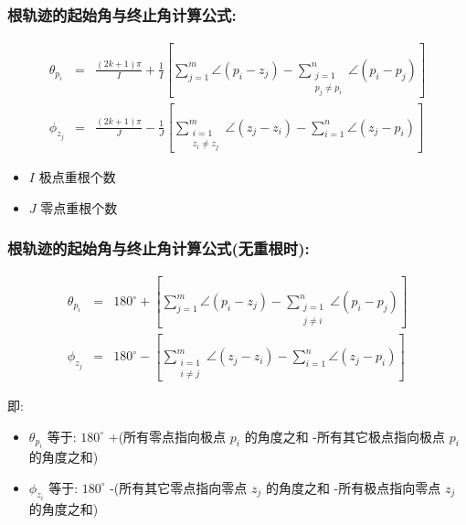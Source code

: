 \documentclass{beamer}
\begin{document}
\begin{frame}
\frametitle{根轨迹的起始角与终止角计算公式:}
\label{sec-1-10}

   
\begin{eqnarray*}
\theta_{p_i} & = & \frac{(2k+1)\pi}{I}+\frac{1}{I}\left[\sum_{j=1}^m\angle(p_i-z_j)-\sum_{\substack{j=1 \\ p_j\neq p_i}}^n\angle(p_i-p_j)\right] \\
\phi_{z_j} & = & \frac{(2k+1)\pi}{J}-\frac{1}{J}\left[\sum_{\substack{i=1 \\ z_i\neq z_j}}^m\angle(z_j-z_i)-\sum_{i=1}^n\angle(z_j-p_i)\right] 
\end{eqnarray*}
\begin{itemize}
\item $I$ 极点重根个数
\item $J$ 零点重根个数
\end{itemize}
\end{frame}
\begin{frame}
\frametitle{根轨迹的起始角与终止角计算公式(无重根时):}
\label{sec-1-11}

   
\begin{eqnarray*}
\theta_{p_i} & = & 180^{\circ}+\left[\sum_{j=1}^m\angle(p_i-z_j)-\sum_{\substack{j=1 \\ j\neq i}}^n\angle(p_i-p_j)\right] \\
\phi_{z_j} & = & 180^{\circ}-\left[\sum_{\substack{i=1 \\ i\neq j}}^m\angle(z_j-z_i)-\sum_{i=1}^n\angle(z_j-p_i)\right] 
\end{eqnarray*}

即:
\begin{itemize}
\item $\theta_{p_i}$  等于:  $180^{\circ}$  +(所有零点指向极点 $p_i$ 的角度之和 -所有其它极点指向极点 $p_i$ 的角度之和)
\item $\phi_{z_i}$ 等于: $180^{\circ}$ -(所有其它零点指向零点 $z_j$ 的角度之和 -所有极点指向零点 $z_j$ 的角度之和)
\end{itemize}
\end{frame}
\end{document}
